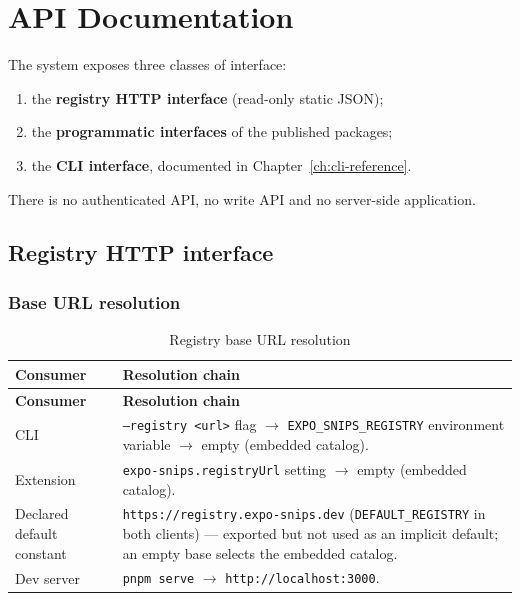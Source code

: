 \chapter{API Documentation}
\label{ch:api-documentation}

The system exposes three classes of interface:

\begin{enumerate}
  \item the \textbf{registry HTTP interface} (read-only static JSON);
  \item the \textbf{programmatic interfaces} of the published packages;
  \item the \textbf{CLI interface}, documented in Chapter~\ref{ch:cli-reference}.
\end{enumerate}

There is no authenticated API, no write API and no server-side application.

\section{Registry HTTP interface}

\subsection*{Base URL resolution}

\begin{longtable}{@{}L{4.2cm}L{10cm}@{}}
\caption{Registry base URL resolution}\\
\toprule
\textbf{Consumer} & \textbf{Resolution chain} \\
\midrule
\endfirsthead
\toprule
\textbf{Consumer} & \textbf{Resolution chain} \\
\midrule
\endhead
CLI & \texttt{--registry <url>} flag $\rightarrow$ \texttt{EXPO\_SNIPS\_REGISTRY}
environment variable $\rightarrow$ empty (embedded catalog). \\
Extension & \texttt{expo-snips.registryUrl} setting $\rightarrow$ empty (embedded
catalog). \\
Declared default constant & \texttt{https://registry.expo-snips.dev}
(\texttt{DEFAULT\_REGISTRY} in both clients) --- exported but not used as an
implicit default; an empty base selects the embedded catalog. \\
Dev server & \texttt{pnpm serve} $\rightarrow$ \texttt{http://localhost:3000}. \\
\bottomrule
\end{longtable}

